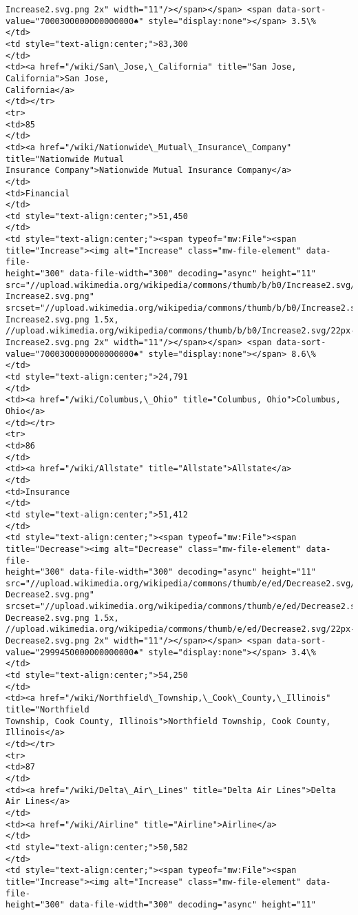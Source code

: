 \documentclass[11pt]{article}
\begin{document}
\begin{Verbatim}[commandchars=\\\{\}]
Increase2.svg.png 2x" width="11"/></span></span> <span data-sort-
value="7000300000000000000♠" style="display:none"></span> 3.5\%
</td>
<td style="text-align:center;">83,300
</td>
<td><a href="/wiki/San\_Jose,\_California" title="San Jose, California">San Jose,
California</a>
</td></tr>
<tr>
<td>85
</td>
<td><a href="/wiki/Nationwide\_Mutual\_Insurance\_Company" title="Nationwide Mutual
Insurance Company">Nationwide Mutual Insurance Company</a>
</td>
<td>Financial
</td>
<td style="text-align:center;">51,450
</td>
<td style="text-align:center;"><span typeof="mw:File"><span
title="Increase"><img alt="Increase" class="mw-file-element" data-file-
height="300" data-file-width="300" decoding="async" height="11"
src="//upload.wikimedia.org/wikipedia/commons/thumb/b/b0/Increase2.svg/11px-
Increase2.svg.png"
srcset="//upload.wikimedia.org/wikipedia/commons/thumb/b/b0/Increase2.svg/17px-
Increase2.svg.png 1.5x,
//upload.wikimedia.org/wikipedia/commons/thumb/b/b0/Increase2.svg/22px-
Increase2.svg.png 2x" width="11"/></span></span> <span data-sort-
value="7000300000000000000♠" style="display:none"></span> 8.6\%
</td>
<td style="text-align:center;">24,791
</td>
<td><a href="/wiki/Columbus,\_Ohio" title="Columbus, Ohio">Columbus, Ohio</a>
</td></tr>
<tr>
<td>86
</td>
<td><a href="/wiki/Allstate" title="Allstate">Allstate</a>
</td>
<td>Insurance
</td>
<td style="text-align:center;">51,412
</td>
<td style="text-align:center;"><span typeof="mw:File"><span
title="Decrease"><img alt="Decrease" class="mw-file-element" data-file-
height="300" data-file-width="300" decoding="async" height="11"
src="//upload.wikimedia.org/wikipedia/commons/thumb/e/ed/Decrease2.svg/11px-
Decrease2.svg.png"
srcset="//upload.wikimedia.org/wikipedia/commons/thumb/e/ed/Decrease2.svg/17px-
Decrease2.svg.png 1.5x,
//upload.wikimedia.org/wikipedia/commons/thumb/e/ed/Decrease2.svg/22px-
Decrease2.svg.png 2x" width="11"/></span></span> <span data-sort-
value="2999450000000000000♠" style="display:none"></span> 3.4\%
</td>
<td style="text-align:center;">54,250
</td>
<td><a href="/wiki/Northfield\_Township,\_Cook\_County,\_Illinois" title="Northfield
Township, Cook County, Illinois">Northfield Township, Cook County, Illinois</a>
</td></tr>
<tr>
<td>87
</td>
<td><a href="/wiki/Delta\_Air\_Lines" title="Delta Air Lines">Delta Air Lines</a>
</td>
<td><a href="/wiki/Airline" title="Airline">Airline</a>
</td>
<td style="text-align:center;">50,582
</td>
<td style="text-align:center;"><span typeof="mw:File"><span
title="Increase"><img alt="Increase" class="mw-file-element" data-file-
height="300" data-file-width="300" decoding="async" height="11"

\end{Verbatim}
\end{document}
